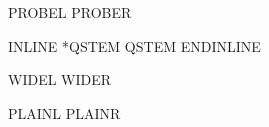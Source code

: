
\GlossPhantomAlign


\noindent PROBEL  PROBER

\noindent INLINE *QSTEM QSTEM ENDINLINE

\noindent WIDEL  WIDER

\noindent PLAINL  PLAINR

